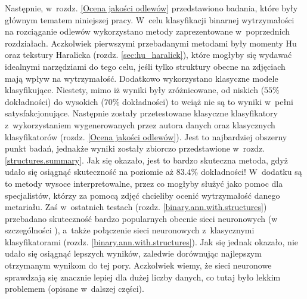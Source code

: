 Następnie, w~rozdz. \ref{Ocena jakości odlewów} przedstawiono badania, które były głównym tematem niniejszej pracy. W~celu klasyfikacji binarnej wytrzymałości na rozciąganie odlewów wykorzystano metody zaprezentowane w~poprzednich rozdziałach. Aczkolwiek pierwszymi przebadanymi metodami były momenty Hu oraz tekstury Haralicka (rozdz. \ref{sec:hu_haralick}), które mogłyby się wydawać idealnymi narzędziami do tego celu, jeśli tylko struktury obecne na zdjęciach mają wpływ na wytrzymałość. Dodatkowo wykorzystano klasyczne modele klasyfikujące. Niestety, mimo iż wyniki były zróżnicowane, od niskich ($55\%$ dokładności) do wysokich ($70\%$ dokładności) to wciąż nie są to wyniki w~pełni satysfakcjonujące. Następnie zostały przetestowane klasyczne klasyfikatory z~wykorzystaniem wygenerowanych przez autora danych oraz klasycznych klasyfikatorów (rozdz. \ref{Ocena jakości odlewów}). Jest to najbardziej obszerny punkt badań, jednakże wyniki zostały zbiorczo przedstawione w~rozdz. \ref{structures.summary}. Jak się okazało, jest to bardzo skuteczna metoda, gdyż udało się osiągnąć skuteczność na poziomie aż $83.4\%$ dokładności! W~dodatku są to metody wysoce interpretowalne, przez co mogłyby służyć jako pomoc dla specjalistów, którzy za pomocą zdjęć chcieliby ocenić wytrzymałość danego metariału. Zaś w~ostatnich testach (rozdz. \ref{binary.ann.with.structures}) przebadano skuteczność bardzo popularnych obecnie sieci neuronowych (w szczególności ), a~także połączenie sieci neuronowych z~klasycznymi klasyfikatorami (rozdz. \ref{binary.ann.with.structures}). Jak się jednak okazało, nie udało się osiągnąć lepszych wyników, zaledwie dorównując najlepszym otrzymanym wynikom do tej pory. Aczkolwiek wiemy, że sieci neuronowe sprawdzają się znacznie lepiej dla dużej liczby danych, co tutaj było lekkim problemem (opisane w~dalszej części).

